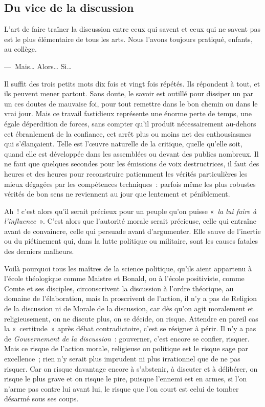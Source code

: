 \documentclass[french,twoside]{book} %
\begin{document}
\subsection[{Du vice de la discussion}]{Du vice de la discussion}
\noindent L’art de faire traîner la discussion entre ceux qui savent et ceux qui ne savent pas est le plus élémentaire de tous les arts. Nous l’avons toujours pratiqué, enfants, au collège.\par
— Mais… Alors… Si…\par
Il suffit des trois petits mots dix fois et vingt fois répétés. Ils répondent à tout, et ils peuvent mener partout. Sans doute, le savoir est outillé pour dissiper un par un ces doutes de mauvaise foi, pour tout remettre dans le bon chemin ou dans le vrai jour. Mais ce travail fastidieux représente une énorme perte de temps, une égale déperdition de forces, sans compter qu’il produit nécessairement au-dehors cet ébranlement de la confiance, cet arrêt plus ou moins net des enthousiasmes qui s’élançaient. Telle est l’œuvre naturelle de la critique, quelle qu’elle soit, quand elle est développée dans les assemblées ou devant des publics nombreux. Il ne faut que quelques secondes pour les émissions de voix destructrices, il faut des heures et des heures pour reconstruire patiemment les vérités particulières les mieux dégagées par les compétences techniques : parfois même les plus robustes vérités de bon sens ne reviennent au jour que lentement et péniblement.\par
Ah ! c’est alors qu’il serait précieux pour un peuple qu’on puisse « \emph{la lui faire à l’influence} ». C’est alors que l’autorité morale serait précieuse, celle qui entraîne avant de convaincre, celle qui persuade avant d’argumenter. Elle sauve de l’inertie ou du piétinement qui, dans la lutte politique ou militaire, sont les causes fatales des derniers malheurs.\par
Voilà pourquoi tous les maîtres de la science politique, qu’ils aient appartenu à l’école théologique comme Maistre et Bonald, ou à l’école positiviste, comme Comte et ses disciples, circonscrivent la discussion à l’ordre théorique, au domaine de l’élaboration, mais la proscrivent de l’action, il n’y a pas de Religion de la discussion ni de Morale de la discussion, car dès qu’on agit moralement et religieusement, on ne discute plus, on se décide, on risque. Attendre en pareil cas la « certitude » après débat contradictoire, c’est se résigner à périr. Il n’y a pas de \emph{Gouvernement de la discussion} : gouverner, c’est encore se confier, risquer. Mais ce risque de l’action morale, religieuse ou politique est le risque sage par excellence ; rien n’y serait plus imprudent ni plus irrationnel que de ne pas risquer. Car on risque davantage encore à s’abstenir, à discuter et à délibérer, on risque le plus grave et on risque le pire, puisque l’ennemi est en armes, si l’on n’arme pas contre lui avant lui, le risque que l’on court est celui de tomber désarmé sous ses coups.
\end{document}
